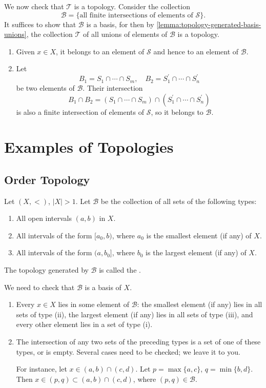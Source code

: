 We now check that $\mathcal{T}$ is a topology. Consider the collection
\[\mathcal{B}=\{\text{all finite intersections of elements of }\mathcal{S}\}.\]
It suffices to show that $\mathcal{B}$ is a basis, for then by \cref{lemma:topology-generated-basis-unions}, the collection $\mathcal{T}$ of all unions of elements of $\mathcal{B}$ is a topology.
\begin{enumerate}[label=(\roman*)]
\item Given $x\in X$, it belongs to an element of $\mathcal{S}$ and hence to an element of $\mathcal{B}$.
\item Let
\[B_1=S_1\cap\cdots\cap S_m,\quad B_2=S_1^\prime\cap\cdots\cap S_n^\prime\]
be two elements of $\mathcal{B}$. Their intersection
\[B_1\cap B_2=(S_1\cap\cdots\cap S_m)\cap(S_1^\prime\cap\cdots\cap S_n^\prime)\]
is also a finite intersection of elements of $\mathcal{S}$, so it belongs to $\mathcal{B}$.
\end{enumerate}
\pagebreak

\section{Examples of Topologies}
\subsection{Order Topology}
\begin{definition}
Let $(X,<)$, $|X|>1$. Let $\mathcal{B}$ be the collection of all sets of the following types:
\begin{enumerate}[label=(\roman*)]
\item All open intervals $(a,b)$ in $X$.
\item All intervals of the form $[a_0,b)$, where $a_0$ is the smallest element (if any) of $X$.
\item All intervals of the form $(a,b_0]$, where $b_0$ is the largest element (if any) of $X$.
\end{enumerate}
The topology generated by $\mathcal{B}$ is called the .
\end{definition}

We need to check that $\mathcal{B}$ is a basis of $X$.
\begin{enumerate}[label=(\roman*)]
\item Every $x\in X$ lies in some element of $\mathcal{B}$: the smallest element (if any) lies in all sets of type (ii), the largest element (if any) lies in all sets of type (iii), and every other element lies in a set of type (i).
\item The intersection of any two sets of the preceding types is a set of one of these types, or is empty. Several cases need to be checked; we leave it to you.

For instance, let $x\in(a,b)\cap(c,d)$. Let $p=\max\{a,c\}$, $q=\min\{b,d\}$. Then $x\in(p,q)\subset(a,b)\cap(c,d)$, where $(p,q)\in\mathcal{B}$.
\end{enumerate}

